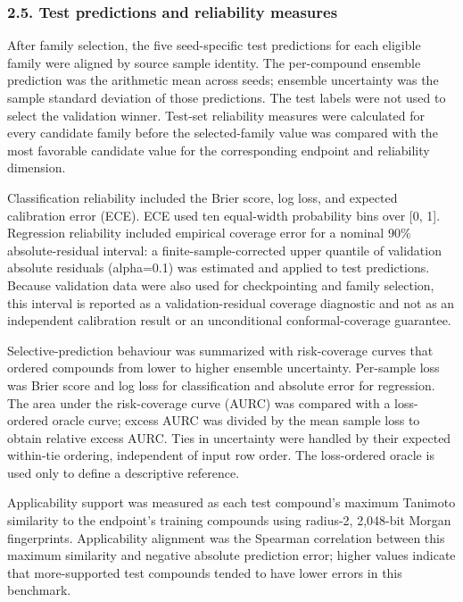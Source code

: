 \documentclass[
]{article}
\begin{document}
\subsubsection{2.5. Test predictions and reliability
measures}\label{test-predictions-and-reliability-measures}

After family selection, the five seed-specific test predictions for each
eligible family were aligned by source sample identity. The per-compound
ensemble prediction was the arithmetic mean across seeds; ensemble
uncertainty was the sample standard deviation of those predictions. The
test labels were not used to select the validation winner. Test-set
reliability measures were calculated for every candidate family before
the selected-family value was compared with the most favorable candidate
value for the corresponding endpoint and reliability dimension.

Classification reliability included the Brier score, log loss, and
expected calibration error (ECE). ECE used ten equal-width probability
bins over {[}0, 1{]}. Regression reliability included empirical coverage
error for a nominal 90\% absolute-residual interval: a
finite-sample-corrected upper quantile of validation absolute residuals
(alpha=0.1) was estimated and applied to test predictions. Because
validation data were also used for checkpointing and family selection,
this interval is reported as a validation-residual coverage diagnostic
and not as an independent calibration result or an unconditional
conformal-coverage guarantee.

Selective-prediction behaviour was summarized with risk-coverage curves
that ordered compounds from lower to higher ensemble uncertainty.
Per-sample loss was Brier score and log loss for classification and
absolute error for regression. The area under the risk-coverage curve
(AURC) was compared with a loss-ordered oracle curve; excess AURC was
divided by the mean sample loss to obtain relative excess AURC. Ties in
uncertainty were handled by their expected within-tie ordering,
independent of input row order. The loss-ordered oracle is used only to
define a descriptive reference.

Applicability support was measured as each test compound's maximum
Tanimoto similarity to the endpoint's training compounds using radius-2,
2,048-bit Morgan fingerprints. Applicability alignment was the Spearman
correlation between this maximum similarity and negative absolute
prediction error; higher values indicate that more-supported test
compounds tended to have lower errors in this benchmark.
\end{document}
